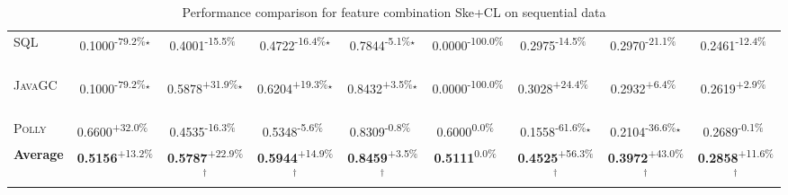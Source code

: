 \begin{table}[htbp]
\begin{tabular}{l|cccc|cccc}
\textsc{SQL} & \cellcolor{red!30}0.1000\textsuperscript{-79.2\%}$^\star$ & \cellcolor{red!30}0.4001\textsuperscript{-15.5\%}$^{\,\,\,}$ & \cellcolor{red!30}0.4722\textsuperscript{-16.4\%}$^\star$ & \cellcolor{red!30}0.7844\textsuperscript{-5.1\%}$^\star$ & \cellcolor{red!30}0.0000\textsuperscript{-100.0\%}$^{\,\,\,}$ & \cellcolor{red!30}0.2975\textsuperscript{-14.5\%}$^{\,\,\,}$ & \cellcolor{red!30}0.2970\textsuperscript{-21.1\%}$^{\,\,\,}$ & \cellcolor{red!30}0.2461\textsuperscript{-12.4\%}$^{\,\,\,}$ \\
\textsc{JavaGC} & \cellcolor{red!30}0.1000\textsuperscript{-79.2\%}$^\star$ & \cellcolor{green!30}0.5878\textsuperscript{+31.9\%}$^\star$ & \cellcolor{green!30}0.6204\textsuperscript{+19.3\%}$^\star$ & \cellcolor{green!30}0.8432\textsuperscript{+3.5\%}$^\star$ & \cellcolor{red!30}0.0000\textsuperscript{-100.0\%}$^{\,\,\,}$ & \cellcolor{green!30}0.3028\textsuperscript{+24.4\%}$^{\,\,\,}$ & \cellcolor{green!30}0.2932\textsuperscript{+6.4\%}$^{\,\,\,}$ & \cellcolor{green!30}0.2619\textsuperscript{+2.9\%}$^{\,\,\,}$ \\
\textsc{Polly} & \cellcolor{green!30}0.6600\textsuperscript{+32.0\%}$^{\,\,\,}$ & \cellcolor{red!30}0.4535\textsuperscript{-16.3\%}$^{\,\,\,}$ & \cellcolor{red!30}0.5348\textsuperscript{-5.6\%}$^{\,\,\,}$ & \cellcolor{red!30}0.8309\textsuperscript{-0.8\%}$^{\,\,\,}$ & \cellcolor{red!30}0.6000\textsuperscript{0.0\%}$^{\,\,\,}$ & \cellcolor{red!30}0.1558\textsuperscript{-61.6\%}$^\star$ & \cellcolor{red!30}0.2104\textsuperscript{-36.6\%}$^\star$ & \cellcolor{red!30}0.2689\textsuperscript{-0.1\%}$^{\,\,\,}$ \\
\hline
\textbf{Average} & \cellcolor{green!30}\textbf{0.5156}\textsuperscript{+13.2\%}$^{\,\,\,}$ & \cellcolor{green!30}\textbf{0.5787}\textsuperscript{+22.9\%}$^\dagger$ & \cellcolor{green!30}\textbf{0.5944}\textsuperscript{+14.9\%}$^\dagger$ & \cellcolor{green!30}\textbf{0.8459}\textsuperscript{+3.5\%}$^\dagger$ & \cellcolor{red!30}\textbf{0.5111}\textsuperscript{0.0\%}$^{\,\,\,}$ & \cellcolor{green!30}\textbf{0.4525}\textsuperscript{+56.3\%}$^\dagger$ & \cellcolor{green!30}\textbf{0.3972}\textsuperscript{+43.0\%}$^\dagger$ & \cellcolor{green!30}\textbf{0.2858}\textsuperscript{+11.6\%}$^\dagger$ \\
\hline
\end{tabular}
\caption{Performance comparison for feature combination Ske+CL on sequential data}
\label{tab:combo_Ske_CL_performance_sequential}
\end{table}